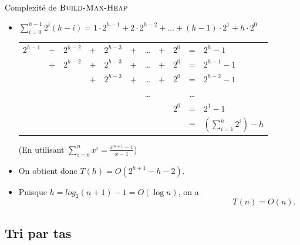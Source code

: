 \begin{frame}{Complexité de $\textnormal{\scshape Build-Max-Heap}$}
\begin{itemize}
\item $\sum_{i=0}^{h-1} 2^i (h-i)=1\cdot 2^{h-1}+2\cdot 2^{h-2}+\ldots+(h-1)\cdot 2^1+h\cdot 2^0$

\bigskip

\begin{small}
\begin{tabular}{ccccccccccl}
$2^{h-1}$ & + & $2^{h-2}$ & + & $2^{h-3}$ & + & \ldots & +& $2^0$ & = & $2^{h}-1$\\
 & + & $2^{h-2}$ & + & $2^{h-3}$ & + & \ldots & +& $2^0$ & = & $2^{h-1}-1$\\
 & & & + & $2^{h-3}$ & + & \ldots & +& $2^0$ & = & $2^{h-2}-1$\\
 &   &        &   &      &   & \ldots &  &    & \ldots & \\
 &   &        &   &     &    &        & & $2^0$ & = & $2^1-1$\\
\hline
 &   &        &   &     &    &        & &     & = & $\left(\sum_{i=1}^h 2^i\right)-h$
\end{tabular}
\end{small}

\medskip

(En utilisant $\sum_{i=0}^n x^i=\frac{x^{n+1}-1}{x-1}$)

\bigskip

\item On obtient donc $T(h)=O(2^{h+1}-h-2).$
\item Puisque $h=log_2(n+1)-1=O(\log n)$, on a $$T(n)=O(n).$$
\end{itemize}
\end{frame}


\subsection{Tri par tas}

